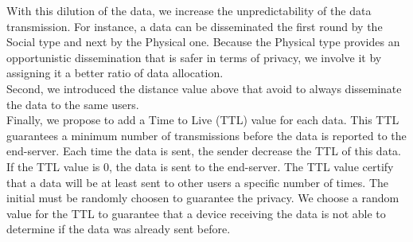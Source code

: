 With this dilution of the data, we increase the unpredictability of the data transmission.
For instance, a data can be disseminated the first round by the Social type and next by the Physical one.
Because the Physical type provides an opportunistic dissemination that is safer in terms of privacy, we involve it by assigning it a better ratio of data allocation.
\\

Second, we introduced the distance value above that avoid to always disseminate the data to the same users.
\\

Finally, we propose to add a Time to Live (TTL) value for each data.
This TTL guarantees a minimum number of transmissions before the data is reported to the end-server.
Each time the data is sent, the sender decrease the TTL of this data.
If the TTL value is 0, the data is sent to the end-server.
The TTL value certify that a data will be at least sent to other users a specific number of times.
The initial must be randomly choosen to guarantee the privacy.
We choose a random value for the TTL to guarantee that a device receiving the data is not able to determine if the data was already sent before.

